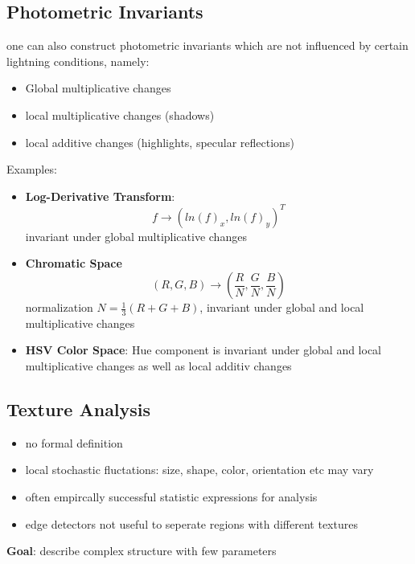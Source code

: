 \documentclass[11pt]{article}
\begin{document}
\subsection{Photometric Invariants}
\label{sec-2-6}
one can also construct photometric invariants which are not influenced by certain
lightning conditions, namely:
\begin{itemize}
\item Global multiplicative changes
\item local multiplicative changes (shadows)
\item local additive changes (highlights, specular reflections)
\end{itemize}
Examples:
\begin{itemize}
\item \textbf{Log-Derivative Transform}:
\[ f \rightarrow \left(ln(f)_x, ln(f)_y \right)^T \]
invariant under global multiplicative changes
\item \textbf{Chromatic Space}
\[ (R,G,B) \rightarrow \left( \frac{R}{N},\frac{G}{N},\frac{B}{N} \right) \]
normalization $N=\frac{1}{3}(R+G+B)$, invariant under global and
local multiplicative changes
\item \textbf{HSV Color Space}: Hue component is invariant under global and local multiplicative
changes as well as local additiv changes
\end{itemize}
\subsection{Texture Analysis}
\label{sec-2-7}
\begin{itemize}
\item no formal definition
\item local stochastic fluctations: size, shape, color, orientation etc may vary
\item often empircally successful statistic expressions for analysis
\item edge detectors not useful to seperate regions with different textures\\
\end{itemize}
\textbf{Goal}: describe complex structure with few parameters
\end{document}
